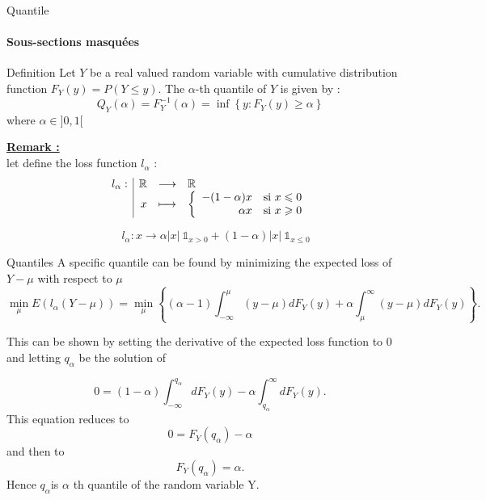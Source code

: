 \documentclass[unknownkeysallowed]{beamer}
\begin{document}
\begin{frame}{Quantile}
  \framesubtitle{Sous-sections masquées}
\begin{alertblock}{Definition}
Let $Y$ be a real valued random variable with cumulative distribution function $ F_{Y}(y)=P(Y\leq y)$.
The $\alpha$-th quantile of $Y$ is given by :
$$
 Q_{Y}(\alpha )=F_{Y}^{-1}(\alpha )=\inf \left\{y:F_{Y}(y)\geq \alpha \right\}
$$
where  $\alpha \in ]0,1[$

\end{alertblock}

\underline{\textbf{Remark :}}\\
let define the loss function $l_{\alpha}$ : 
$$\begin{array}{l|rcl}
    l_{\alpha} : & \mathbb{R} & \longrightarrow & \mathbb{R} \\
    & x & \longmapsto &  
    \left \{
   \begin{array}{r c l}
      -(1-\alpha) x \quad \text{si $x\leqslant 0$}\\
      \alpha x \quad \text{si $x\geqslant 0$}
   \end{array}
   \right .
\end{array}$$

$$\quad  l_{\alpha}:x \rightarrow \alpha |x|~  \mathds{1}_{x >0} + (1-\alpha) |x|~ \mathds{1}_{x \leqslant 0}$$

\end{frame}

\begin{frame}{Quantiles}
A specific quantile can be found by minimizing the expected loss of $Y-\mu$ with respect to $\mu$  \\

$$
\underset {\mu}{\min }E(l _{\alpha }(Y-\mu))= {\underset {\mu}{\min }} \left\{(\alpha -1)\int _{-\infty }^{\mu}(y-\mu)dF_{Y}(y)+\alpha \int _{\mu}^{\infty }(y-\mu)dF_{Y}(y)\right\}.
$$

This can be shown by setting the derivative of the expected loss function to $0$ and letting $q_{\alpha }$ be the solution of

$$
0=(1-\alpha)\int_{-\infty}^{q_{\alpha}}dF_{Y}(y)-\alpha\int_{q_{\alpha}}^{\infty}dF_{Y}(y).
$$
This equation reduces to
$$
0=F_{Y}(q_{\alpha })-\alpha
$$
and then to
$$
F_{Y}(q_{\alpha })=\alpha .
$$
Hence $ q_{\alpha}$is $\alpha$ th quantile of the random variable Y.

\end{frame}
\end{document}
